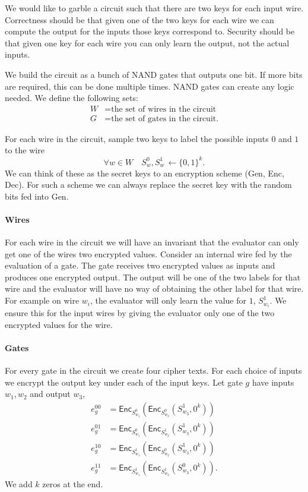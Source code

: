 \documentclass[12pt]{tufte-book}
\newcommand{\Enc}{\mathsf{Enc}}
\begin{document}
We would like to garble a circuit such that there are two keys for each input wire.
Correctness should be that 
given one of the two keys for each wire we can compute the output for the inputs those keys correspond to.
Security should be that 
given one key for each wire you can only learn the output, not the actual inputs.



We build the circuit as a bunch of NAND gates that outputs one bit. 
If more bits are required, this can be done multiple times.
NAND gates can create any logic needed. 
We define the following sets:
\begin{align*}
W &= \text{the set of wires in the circuit}\\
G &= \text{the set of gates in the circuit.}
\end{align*}

For  each wire in the circuit, sample two keys
to label the possible inputs $0$ and $1$  to the wire
\[
\forall w \in W  \quad S_w^0, S_w^1 \,  \leftarrow{} \{0,1\}^k.
\]
We can think of these as the secret keys to an encryption scheme
(Gen, Enc, Dec).
For such a scheme we can always replace the secret key with the random bits fed into Gen.


\paragraph{Wires}
For each wire in the circuit we will have an invariant that the evaluator can only get one of the wires two encrypted values.
Consider an internal wire fed by the evaluation of a gate. The gate receives two encrypted values as inputs
and produces one encrypted output. The output will be one of the two labels for that wire and the evaluator will have no 
way of obtaining the other label for that wire. 
For example on wire $w_i$, the evaluator will only learn the value for $1$,  $S_{w_i}^1$.
We ensure this for the input wires by giving the evaluator only one of the two encrypted values for the wire.

\paragraph{Gates}
For every gate in the circuit we create four cipher texts. 
For each choice of inputs we encrypt the output key under each of the input keys. 
Let gate $g$ have inputs $w_1, w_2$ and output $w_3$,
\begin{align*}
e_g^{00} &= \Enc_{S_{w_1}^0} ( \Enc_{S_{w_2}^0}  ( S_{w_3}^1, 0^k) )\\
e_g^{01} &= \Enc_{S_{w_1}^0} ( \Enc_{S_{w_2}^1}  ( S_{w_3}^1, 0^k) )\\
e_g^{10} &= \Enc_{S_{w_1}^1} ( \Enc_{S_{w_2}^0}  ( S_{w_3}^1, 0^k) )\\
e_g^{11} &= \Enc_{S_{w_1}^1} ( \Enc_{S_{w_2}^1}  ( S_{w_3}^0, 0^k) ).
\end{align*}
We add $k$ zeros at the end.
\end{document}
